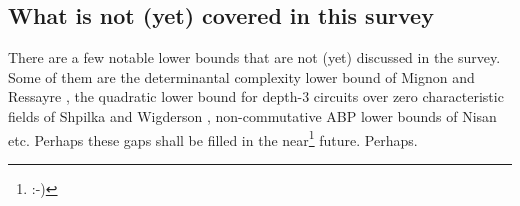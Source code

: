 \subsection*{What is not (yet) covered in this survey}

There are a few notable lower bounds that are not (yet) discussed in the survey. Some of them are the determinantal complexity lower bound of Mignon and Ressayre \cite{mr04}, the quadratic lower bound for depth-$3$ circuits over zero characteristic fields of Shpilka and Wigderson \cite{sw2001}, non-commutative ABP lower bounds of Nisan \cite{nis91} etc. Perhaps these gaps shall be filled in the near\footnote{:-)} future. Perhaps. 


